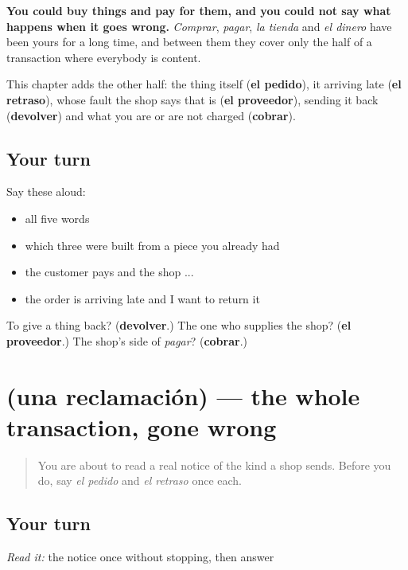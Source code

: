 \begin{grammarlens}[title={What you've built}]
\textbf{You could buy things and pay for them, and you could not say what happens when it goes wrong.} \emph{Comprar}, \emph{pagar}, \emph{la tienda} and \emph{el dinero} have been yours for a long time, and between them they cover only the half of a transaction where everybody is content.

This chapter adds the other half: the thing itself (\textbf{el pedido}), it arriving late (\textbf{el retraso}), whose fault the shop says that is (\textbf{el proveedor}), sending it back (\textbf{devolver}) and what you are or are not charged (\textbf{cobrar}).
\end{grammarlens}

\subsection*{Your turn}
Say these aloud:

\begin{itemize}
\raggedright
  \item all five words
  \item which three were built from a piece you already had
  \item the customer pays and the shop ...
  \item the order is arriving late and I want to return it
\end{itemize}

\begin{tcolorbox}[breakable,colback=teal!4,colframe=teal!35!black,title={Before you move on}]
To give a thing back? (\textbf{devolver}.) The one who supplies the shop? (\textbf{el proveedor}.) The shop's side of \emph{pagar}? (\textbf{cobrar}.)
\end{tcolorbox}
\section[Practice]{(una reclamación) — the whole transaction, gone wrong}

\label{lesson:ES-C431-sintesis-reclamacion}



\begin{quote}
You are about to read a real notice of the kind a shop sends. Before you do, say \emph{el pedido} and \emph{el retraso} once each.
\end{quote}

\subsection*{Your turn}
\emph{Read it:} the notice once without stopping, then answer


